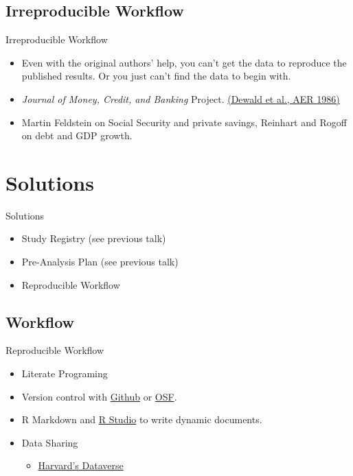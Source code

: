 \documentclass{beamer}
\begin{document}
 
\subsection{Irreproducible Workflow}
 \begin{frame}{Irreproducible Workflow}
 \begin{itemize}
 \item
  Even with the original authors' help, you can't get the data to reproduce the published results. Or you just can't find the data to begin with. 
  \item \textit{Journal of Money, Credit, and Banking} Project. \href{http://www.jstor.org/stable/1806061}{(Dewald et al., AER 1986)}
   \item Martin Feldstein on Social Security and private savings, Reinhart and Rogoff on debt and GDP growth.
 \end{itemize} 
 \end{frame}

\section{Solutions}
\begin{frame}{Solutions}
\begin{itemize}[<+->]
\item Study Registry (see previous talk)
\item Pre-Analysis Plan (see previous talk)
\item Reproducible Workflow
\end{itemize}
\end{frame}


\subsection{Workflow}
\begin{frame}{Reproducible Workflow}
 \begin{itemize}
 \item Literate Programing 
 \item Version control with \href{http://www.github.com}{Github} or \href{http://osf.io}{OSF}.
  \item R Markdown and \href{http://rstudio.com}{R Studio} to write dynamic documents.
 \item Data Sharing
 \begin{itemize}
 \item \href{http://www.thedata.org}{Harvard's Dataverse}
 \end{itemize}
\end{itemize}
\end{frame}
\end{document}
